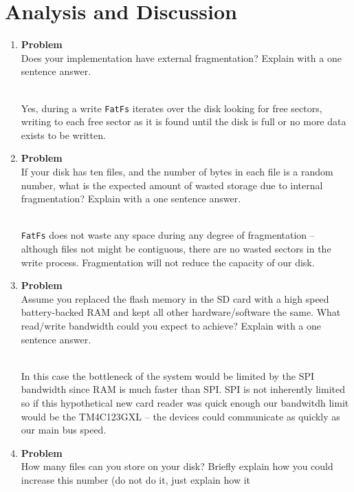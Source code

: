 \documentclass[12pt]{article}
\newenvironment{Ex}{\textbf{Problem}\vspace{.25em}\\}{}
\newcommand{\hbr}{\hfill\vspace{.25em}\\}
\begin{document}
\section{Analysis and Discussion}
\begin{enumerate}
\item
  \begin{Ex}
    Does your implementation have external fragmentation? Explain with
    a one sentence answer.
    \begin{solution} \hbr
      Yes, during a write \verb|FatFs| iterates over the disk looking
      for free sectors, writing to each free sector as it is found
      until the disk is full or no more data exists to be written.
    \end{solution}
  \end{Ex}
\item
  \begin{Ex}
    If your disk has ten files, and the number of bytes in each file
    is a random number, what is the expected amount of wasted storage
    due to internal fragmentation? Explain with a one sentence answer.
    \begin{solution} \hbr
      \verb|FatFs| does not waste any space during any degree of
      fragmentation -- although files not might be contiguous, there
      are no wasted sectors in the write process. Fragmentation will
      not reduce the capacity of our disk.
    \end{solution}
  \end{Ex}
\item
  \begin{Ex}
    Assume you replaced the flash memory in the SD card with a high
    speed battery-backed RAM and kept all other hardware/software the
    same. What read/write bandwidth could you expect to achieve?
    Explain with a one sentence answer.
    \begin{solution} \hbr
      In this case the bottleneck of the system would be limited by
      the SPI bandwidth since RAM is much faster than SPI. SPI is not
      inherently limited so if this hypothetical new card reader was
      quick enough our bandwitdh limit would be the TM4C123GXL -- the
      devices could communicate as quickly as our main bus speed.
    \end{solution}
  \end{Ex}
\item
  \begin{Ex}
    How many files can you store on your disk? Briefly explain how you
    could increase this number (do not do it, just explain how it

\end{Ex}
\end{enumerate}
\end{document}
